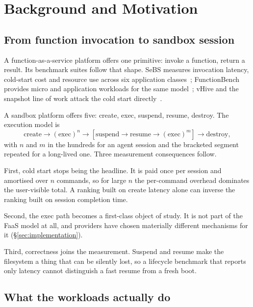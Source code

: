 \section{Background and Motivation}
\label{sec:background}

\subsection{From function invocation to sandbox session}

A function-as-a-service platform offers one primitive: invoke a function,
return a result. Its benchmark suites follow that shape. SeBS measures
invocation latency, cold-start cost and resource use across six application
classes~\cite{sebs2021}; FunctionBench provides micro and application
workloads for the same model~\cite{functionbench2019}; vHive and the snapshot
line of work attack the cold start directly~\cite{vhive2021,catalyzer2020}.

A sandbox platform offers five: create, exec, suspend, resume, destroy. The
execution model is
\[
  \text{create} \rightarrow (\text{exec})^{n} \rightarrow
  [\text{suspend} \rightarrow \text{resume} \rightarrow (\text{exec})^{m}]
  \rightarrow \text{destroy},
\]
with $n$ and $m$ in the hundreds for an agent session and the bracketed
segment repeated for a long-lived one. Three measurement consequences follow.

First, cold start stops being the headline. It is paid once per session and
amortised over $n$ commands, so for large $n$ the per-command overhead
dominates the user-visible total. A ranking built on create latency alone can
inverse the ranking built on session completion time. 

Second, the exec path becomes a first-class object of study. It is not part of
the FaaS model at all, and providers have chosen materially different
mechanisms for it (\S\ref{sec:implementation}).

Third, correctness joins the measurement. Suspend and resume make the
filesystem a thing that can be silently lost, so a lifecycle benchmark that
reports only latency cannot distinguish a fast resume from a fresh boot.

\subsection{What the workloads actually do}
\label{sec:background:characterisation}

